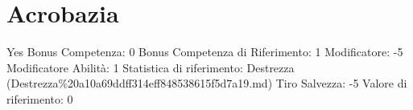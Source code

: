 \section{Acrobazia}\label{acrobazia}

\begin{description}
\tightlist
\item[Tags: ABI]
Yes Bonus Competenza: 0 Bonus Competenza di Riferimento: 1 Modificatore:
-5 Modificatore Abilità: 1 Statistica di riferimento: Destrezza
(Destrezza\%20a10a69ddff314eff848538615f5d7a19.md) Tiro Salvezza: -5
Valore di riferimento: 0
\end{description}
